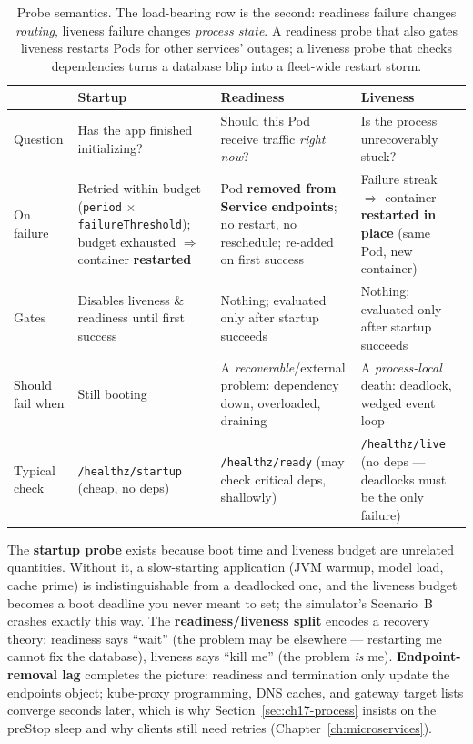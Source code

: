 \begin{table}[h]
  \centering
  \small
  \begin{tabularx}{\textwidth}{l X X X}
    \toprule
    & \textbf{Startup} & \textbf{Readiness} & \textbf{Liveness} \\
    \midrule
    Question & Has the app finished initializing? & Should this Pod receive traffic \emph{right now}? & Is the process unrecoverably stuck? \\
    On failure & Retried within budget (\texttt{period} $\times$ \texttt{failureThreshold}); budget exhausted $\Rightarrow$ container \textbf{restarted} & Pod \textbf{removed from Service endpoints}; no restart, no reschedule; re-added on first success & Failure streak $\Rightarrow$ container \textbf{restarted in place} (same Pod, new container) \\
    Gates & Disables liveness \& readiness until first success & Nothing; evaluated only after startup succeeds & Nothing; evaluated only after startup succeeds \\
    Should fail when & Still booting & A \emph{recoverable}/external problem: dependency down, overloaded, draining & A \emph{process-local} death: deadlock, wedged event loop \\
    Typical check & \texttt{/healthz/startup} (cheap, no deps) & \texttt{/healthz/ready} (may check critical deps, shallowly) & \texttt{/healthz/live} (no deps --- deadlocks must be the only failure) \\
    \bottomrule
  \end{tabularx}
  \caption{Probe semantics. The load-bearing row is the second:
  readiness failure changes \emph{routing}, liveness failure changes
  \emph{process state}. A readiness probe that also gates liveness
  restarts Pods for other services' outages; a liveness probe that
  checks dependencies turns a database blip into a fleet-wide restart
  storm.}
  \label{tab:ch17-probes}
\end{table}

The \textbf{startup probe} exists because boot time and liveness budget
are unrelated quantities. Without it, a slow-starting application (JVM
warmup, model load, cache prime) is indistinguishable from a deadlocked
one, and the liveness budget becomes a boot deadline you never meant to
set; the simulator's Scenario~B crashes exactly this way. The
\textbf{readiness/liveness split} encodes a recovery theory: readiness
says ``wait'' (the problem may be elsewhere --- restarting me cannot fix
the database), liveness says ``kill me'' (the problem \emph{is} me).
\textbf{Endpoint-removal lag} completes the picture: readiness and
termination only update the endpoints object; kube-proxy programming,
DNS caches, and gateway target lists converge seconds later, which is
why Section~\ref{sec:ch17-process} insists on the preStop sleep and why
clients still need retries (Chapter~\ref{ch:microservices}).

